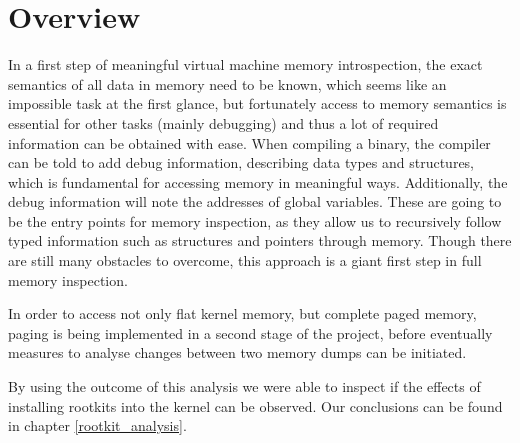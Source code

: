 \section{Overview}
In a first step of meaningful virtual machine memory introspection, the exact semantics of all data in memory need to be known,
which seems like an impossible task at the first glance, but fortunately access to memory semantics is essential for
other tasks (mainly debugging) and thus a lot of required information can be obtained with ease.
When compiling a binary, the compiler can be told to add debug information, describing data types and structures,
which is fundamental for accessing memory in meaningful ways. Additionally, the debug information will note the addresses
of global variables. These are going to be the entry points for memory inspection, as they allow us to recursively
follow typed information such as structures and pointers through memory.
Though there are still many obstacles to overcome, this approach is a giant first step in full memory inspection.

In order to access not only flat kernel memory, but complete paged memory, paging is being implemented in a second stage of the project, before eventually measures to analyse changes between two memory dumps can be initiated.

By using the outcome of this analysis we were able to inspect if the effects of installing rootkits into the kernel can be observed. Our conclusions can be found in chapter \ref{rootkit_analysis}.

\newpage
